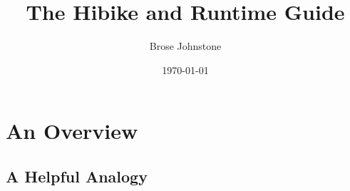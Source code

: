 \documentclass[12pt]{book}
\title{The Hibike and Runtime Guide}
\date{\today}
\author{Brose Johnstone}
\begin{document}
\maketitle

\tableofcontents

\chapter{An Overview}
\section{A Helpful Analogy}
\end{document}
